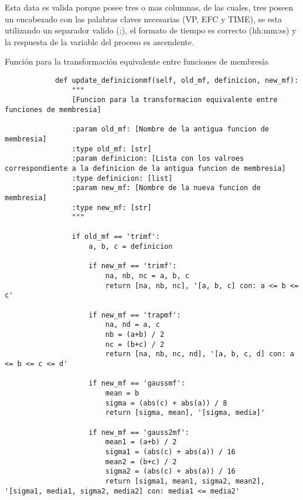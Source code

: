     Esta data es valida porque posee tres o mas columnas, de las cuales, tres poseen un encabezado con las palabras claves necesarias (VP, EFC y TIME), se esta utilizando un separador valido (;), el formato de tiempo es correcto (hh:mm:ss) y la respuesta de la variable del proceso es ascendente.

    \begin{longlisting}
        \caption{Función para la transformación equivalente entre funciones de membresía}
        \label{code:1}				
        \begin{verbatim}
            def update_definicionmf(self, old_mf, definicion, new_mf):
                """
                [Funcion para la transformacion equivalente entre funciones de membresia]
                
                :param old_mf: [Nombre de la antigua funcion de membresia]
                :type old_mf: [str]
                :param definicion: [Lista con los valroes correspondiente a la definicion de la antigua funcion de membresia]
                :type definicion: [list]
                :param new_mf: [Nombre de la nueva funcion de membresia]
                :type new_mf: [str]
                """
                
                if old_mf == 'trimf':
                    a, b, c = definicion

                    if new_mf == 'trimf':
                        na, nb, nc = a, b, c
                        return [na, nb, nc], '[a, b, c] con: a <= b <= c'

                    if new_mf == 'trapmf':
                        na, nd = a, c
                        nb = (a+b) / 2
                        nc = (b+c) / 2
                        return [na, nb, nc, nd], '[a, b, c, d] con: a <= b <= c <= d'

                    if new_mf == 'gaussmf':
                        mean = b
                        sigma = (abs(c) + abs(a)) / 8
                        return [sigma, mean], '[sigma, media]'

                    if new_mf == 'gauss2mf':
                        mean1 = (a+b) / 2
                        sigma1 = (abs(c) + abs(a)) / 16
                        mean2 = (b+c) / 2
                        sigma2 = (abs(c) + abs(a)) / 16
                        return [sigma1, mean1, sigma2, mean2], '[sigma1, media1, sigma2, media2] con: media1 <= media2'


\end{verbatim}
\end{longlisting}
